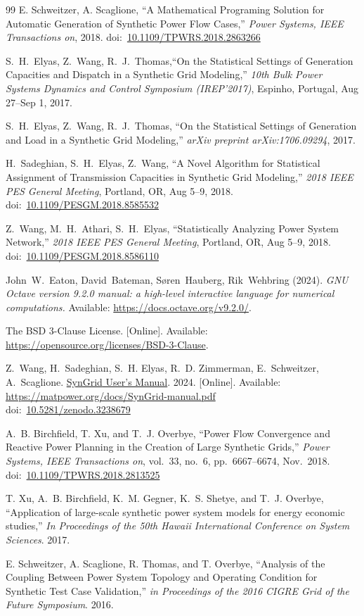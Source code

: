 \documentclass[12pt]{article}
\newcommand{\syngrid}[0]{{SynGrid}}
\newcommand{\syngridver}[0]{1.0.2}
\newcommand{\syngridmanurl}[0]{https://matpower.org/docs/SynGrid-manual-\syngridver.pdf}
\newcommand{\syngridman}[0]{\href{\syngridmanurl}{\syngrid{} User's Manual}}
\newcommand{\doi}[1]{doi:~\href{https://doi.org/#1}{#1}}
\numberwithin{equation}{section}
\numberwithin{table}{section}
\numberwithin{figure}{section}
\begin{document}
\begin{thebibliography}{99}
E. Schweitzer, A. Scaglione, ``A Mathematical Programing Solution for Automatic Generation of Synthetic Power Flow Cases,''  \emph{Power Systems, IEEE Transactions on}, 2018. \doi{10.1109/TPWRS.2018.2863266}

S.~H.~Elyas, Z.~Wang, R.~J.~Thomas,``On the Statistical Settings of Generation Capacities and Dispatch in a Synthetic Grid Modeling,'' \emph{10th Bulk Power Systems Dynamics and Control Symposium (IREP'2017)}, Espinho, Portugal, Aug 27--Sep 1, 2017.

S.~H.~Elyas, Z.~Wang, R.~J.~Thomas,
  ``On the Statistical Settings of Generation and Load in a Synthetic Grid Modeling,'' \emph{arXiv preprint arXiv:1706.09294}, 2017.

H.~Sadeghian, S.~H.~Elyas, Z.~Wang, ``A Novel Algorithm for Statistical Assignment of Transmission Capacities in Synthetic Grid Modeling,''
\emph{2018 IEEE PES General Meeting}, Portland, OR, Aug 5--9, 2018.
\doi{10.1109/PESGM.2018.8585532}

Z.~Wang, M.~H.~Athari, S.~H.~Elyas, ``Statistically Analyzing Power System Network,'' \emph{2018 IEEE PES General Meeting}, Portland, OR, Aug 5--9, 2018.
\doi{10.1109/PESGM.2018.8586110}

John~W.~Eaton, David~Bateman, S{\o}ren~Hauberg, Rik~Wehbring (2024). \emph{GNU Octave version 9.2.0 manual: a high-level interactive language for numerical computations.} Available: \url{https://docs.octave.org/v9.2.0/}.

The BSD 3-Clause License. [Online]. Available: \url{https://opensource.org/licenses/BSD-3-Clause}.

Z.~Wang, H.~Sadeghian, S.~H. Elyas, R.~D. Zimmerman, E.~Schweitzer,
A.~Scaglione. \syngridman{}. 2024.
[Online]. Available: \url{https://matpower.org/docs/SynGrid-manual.pdf}\\
\doi{10.5281/zenodo.3238679}

A.~B. Birchfield, T. Xu, and T.~J. Overbye, ``Power Flow Convergence and Reactive Power Planning in the Creation of Large Synthetic Grids,''  \emph{Power Systems, IEEE Transactions on}, vol.~33, no.~6, pp.~6667--6674, Nov.~2018.\\ \doi{10.1109/TPWRS.2018.2813525}

T. Xu, A.~B. Birchfield, K.~M. Gegner, K.~S. Shetye, and T.~J. Overbye, ``Application of large-scale synthetic power system models for energy economic studies,''  \emph{In Proceedings of the 50th Hawaii International Conference on System Sciences}. 2017.

E. Schweitzer, A. Scaglione, R. Thomas, and T. Overbye, ``Analysis of the Coupling Between Power System Topology and Operating Condition for Synthetic Test Case Validation,'' \emph{in Proceedings of the 2016 CIGRE Grid of the Future Symposium}. 2016.
\end{thebibliography}
\end{document}
